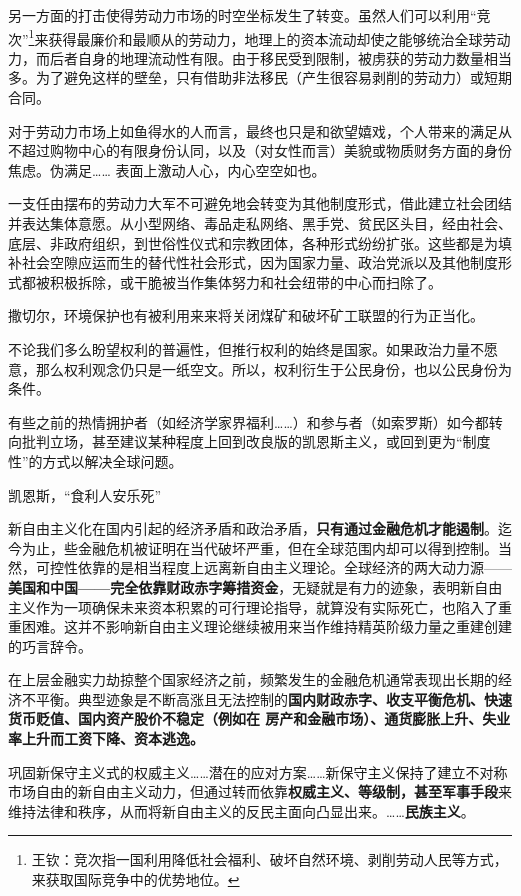 另一方面的打击使得劳动力市场的时空坐标发生了转变。虽然人们可以利用“竞次”\footnote{王钦：竞次指一国利用降低社会福利、破坏自然环境、剥削劳动人民等方式，来获取国际竞争中的优势地位。}来获得最廉价和最顺从的劳动力，地理上的资本流动却使之能够统治全球劳动力，而后者自身的地理流动性有限。由于移民受到限制，被虏获的劳动力数量相当多。为了避免这样的壁垒，只有借助非法移民（产生很容易剥削的劳动力）或短期合同。

对于劳动力市场上如鱼得水的人而言，最终也只是和欲望嬉戏，个人带来的满足从不超过购物中心的有限身份认同，以及（对女性而言）美貌或物质财务方面的身份焦虑。伪满足…… 表面上激动人心，内心空空如也。

一支任由摆布的劳动力大军不可避免地会转变为其他制度形式，借此建立社会团结并表达集体意愿。从小型网络、毒品走私网络、黑手党、贫民区头目，经由社会、底层、非政府组织，到世俗性仪式和宗教团体，各种形式纷纷扩张。这些都是为填补社会空隙应运而生的替代性社会形式，因为国家力量、政治党派以及其他制度形式都被积极拆除，或干脆被当作集体努力和社会纽带的中心而扫除了。

撒切尔，环境保护也有被利用来来将关闭煤矿和破坏矿工联盟的行为正当化。

不论我们多么盼望权利的普遍性，但推行权利的始终是国家。如果政治力量不愿意，那么权利观念仍只是一纸空文。所以，权利衍生于公民身份，也以公民身份为条件。

有些之前的热情拥护者（如经济学家界福利……）和参与者（如索罗斯）如今都转向批判立场，甚至建议某种程度上回到改良版的凯恩斯主义，或回到更为“制度性”的方式以解决全球问题。

凯恩斯，“食利人安乐死”

新自由主义化在国内引起的经济矛盾和政治矛盾，\textbf{只有通过金融危机才能遏制}。迄今为止，些金融危机被证明在当代破坏严重，但在全球范围内却可以得到控制。当然，可控性依靠的是相当程度上远离新自由主义理论。全球经济的两大动力源——\textbf{美国和中国——完全依靠财政赤字筹措资金}，无疑就是有力的迹象，表明新自由主义作为一项确保未来资本积累的可行理论指导，就算没有实际死亡，也陷入了重重困难。这并不影响新自由主义理论继续被用来当作维持精英阶级力量之重建创建的巧言辞令。

在上层金融实力劫掠整个国家经济之前，频繁发生的金融危机通常表现出长期的经济不平衡。典型迹象是不断高涨且无法控制的\textbf{国内财政赤字、收支平衡危机、快速货币贬值、国内资产股价不稳定（例如在 房产和金融市场）、通货膨胀上升、失业率上升而工资下降、资本逃逸。}

巩固新保守主义式的权威主义……潜在的应对方案……新保守主义保持了建立不对称市场自由的新自由主义动力，但通过转而依靠\textbf{权威主义、等级制，甚至军事手段}来维持法律和秩序，从而将新自由主义的反民主面向凸显出来。……\textbf{民族主义}。

